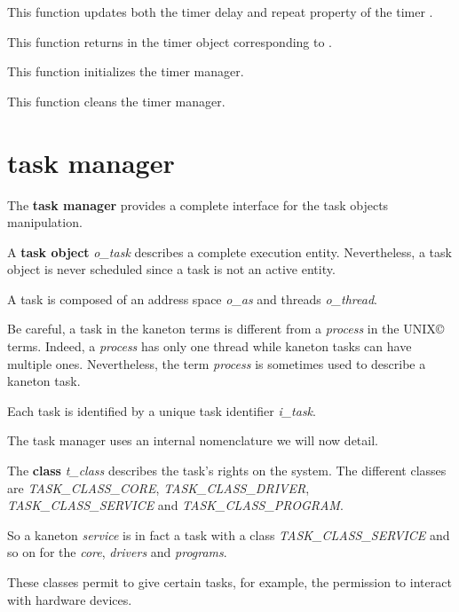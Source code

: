 	 {
	   This function updates both the timer delay and repeat property
	   of the timer .
	 }

	 {
	   This function returns in  the timer object
	   corresponding to .
	 }

	 {
	   This function initializes the timer manager.
	 }

	 {
	   This function cleans the timer manager.
	 }

%
%

\section{task manager}

The \textbf{task manager} provides a complete interface for the task
objects manipulation.

A \textbf{task object} \textit{o\_task} describes a complete execution
entity. Nevertheless, a task object is never scheduled since a task
is not an active entity.

A task is composed of an address space \textit{o\_as} and threads
\textit{o\_thread}.

Be careful, a task in the kaneton terms is different from a \textit{process}
in the UNIX{\copyright} terms. Indeed, a \textit{process} has only one
thread while kaneton tasks can have multiple ones. Nevertheless, the
term \textit{process} is sometimes used to describe a kaneton task.

Each task is identified by a unique task identifier \textit{i\_task}.

The task manager uses an internal nomenclature we will now detail.

The \textbf{class} \textit{t\_class} describes the task's rights on the
system. The different classes are \textit{TASK\_CLASS\_CORE},
\textit{TASK\_CLASS\_DRIVER}, \textit{TASK\_CLASS\_SERVICE} and
\textit{TASK\_CLASS\_PROGRAM}.

So a kaneton \textit{service} is in fact a task with a class
\textit{TASK\_CLASS\_SERVICE} and so on for the \textit{core},
\textit{drivers} and \textit{programs}.

These classes permit to give certain tasks, for example, the permission
to interact with hardware devices.

